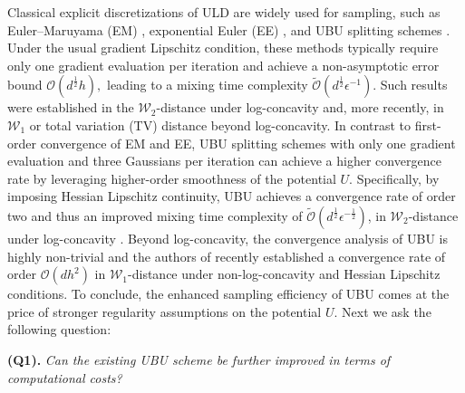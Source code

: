 \documentclass[12pt]{article}
\numberwithin{equation}{section}
\begin{document}
Classical explicit discretizations of ULD are widely used for sampling, such as Euler--Maruyama (EM) \cite{schuh2024convergence}, exponential Euler (EE) \cite{cheng2018underdamped, dalalyan2020sampling, sanz2021wasserstein}, and UBU splitting schemes \cite{zapatero2017word,leimkuhler2024contraction,sanz2021wasserstein}.
Under the usual gradient Lipschitz condition, these methods typically require only one gradient evaluation per iteration and achieve a non-asymptotic error bound
\(
\mathcal O(d^{\frac12}h),
\)
leading to a mixing time complexity
\(
\widetilde{\mathcal O}(d^{\frac12}\epsilon^{-1}).
\)
Such results were established in the \(\mathcal W_2\)-distance under log-concavity \cite{cheng2018underdamped, dalalyan2020sampling, sanz2021wasserstein, schuh2024convergence} and, more recently, in  \(\mathcal W_1\) \cite{schuh2024convergence} or total variation (TV) \cite{zhang2023improved} distance beyond log-concavity.
%
In contrast to first-order convergence of EM and EE, UBU splitting schemes with only one gradient evaluation and three Gaussians per iteration \cite{sanz2021wasserstein} can achieve a higher convergence rate by leveraging higher-order smoothness of the potential $U$. Specifically, by imposing Hessian Lipschitz continuity, UBU achieves a convergence rate of order two and thus an improved mixing time complexity of $\widetilde{\mathcal{O}}(d^{\frac{1}{2}}\epsilon^{-\frac{1}{2}})$, in $\mathcal{W}_2$-distance under log-concavity \cite{sanz2021wasserstein}. 
Beyond log-concavity, the convergence analysis of UBU is highly non-trivial and the authors of \cite{schuh2024convergence} recently established a convergence rate of order $\mathcal{O}(d h^2)$ in $\mathcal{W}_1$-distance under non-log-concavity and Hessian Lipschitz conditions. 
To conclude, the enhanced sampling efficiency of UBU comes at the price of stronger regularity assumptions on the potential $U$.
%
Next we ask the following question:
\vspace{0.2cm}

{\bf (Q1).} {\it
Can the existing UBU scheme be further improved in terms of computational costs?
}
\vspace{0.2cm}
\end{document}
